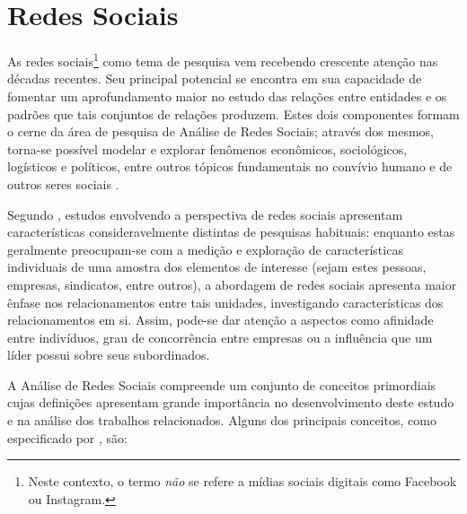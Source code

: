 \section{Redes Sociais} \label{sec:socialnetworks}

As redes sociais\footnote{Neste contexto, o termo \emph{não} se refere a mídias sociais digitais como Facebook ou Instagram.} como tema de pesquisa vem recebendo crescente atenção nas décadas recentes. Seu principal potencial se encontra em sua capacidade de fomentar um aprofundamento maior no estudo das relações entre entidades e os padrões que tais conjuntos de relações produzem. Estes dois componentes formam o cerne da área de pesquisa de Análise de Redes Sociais; através dos mesmos, torna-se possível modelar e explorar fenômenos econômicos, sociológicos, logísticos e políticos, entre outros tópicos fundamentais no convívio humano e de outros seres sociais \cite{Wasserman1994}.

Segundo , estudos envolvendo a perspectiva de redes sociais apresentam características consideravelmente distintas de pesquisas habituais: enquanto estas geralmente preocupam-se com a medição e exploração de características individuais de uma amostra dos elementos de interesse (sejam estes pessoas, empresas, sindicatos, entre outros), a abordagem de redes sociais apresenta maior ênfase nos relacionamentos entre tais unidades, investigando características dos relacionamentos em si. Assim, pode-se dar atenção a aspectos como afinidade entre indivíduos, grau de concorrência entre empresas ou a influência que um líder possui sobre seus subordinados.

A Análise de Redes Sociais compreende um conjunto de conceitos primordiais cujas definições apresentam grande importância no desenvolvimento deste estudo e na análise dos trabalhos relacionados. Alguns dos principais conceitos, como especificado por , são:

